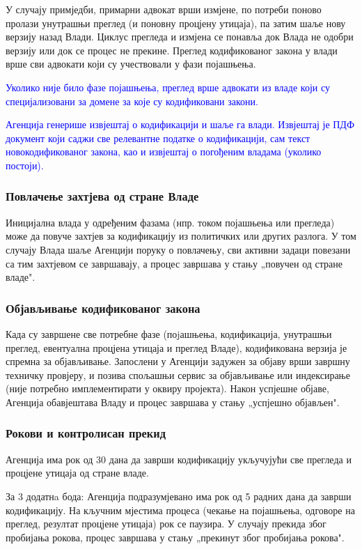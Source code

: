 \documentclass[12pt,a4paper]{article}
\newcommand{\optional}[1]{\textcolor{blue}{#1}}
\newcommand{\bonus}[1]{\textcolor{emerald}{#1}}
\begin{document}
У случају примједби, примарни адвокат врши измјене, по потреби поново пролази унутрашњи преглед (и поновну процјену утицаја), па затим шаље нову верзију назад Влади. Циклус прегледа и измјена се понавља док Влада не одобри верзију или док се процес не прекине. Преглед кодификованог закона у влади врше сви адвокати који су учествовали у фази појашњења.

\optional{Уколико није било фазе појашњења, преглед врше адвокати из владе који су специјализовани за домене за које су кодификовани закони.}

\optional{Агенција генерише извјештај о кодификацији и шаље га влади. Извјештај је ПДФ документ који саджи све релевантне податке о кодификацији, сам текст новокодификованог закона, као и извјештај о погођеним владама (уколико постоји).}

\subsubsection{Повлачење захтјева од стране Владе}

Иницијална влада у одређеним фазама (нпр. током појашњења или прегледа) може да повуче захтјев за кодификацију из политичких или других разлога. У том случају Влада шаље Агенцији поруку о повлачењу, сви активни задаци повезани са тим захтјевом се завршавају, а процес завршава у стању „повучен од стране владе".

\subsubsection{Објављивање кодификованог закона}

Када су завршене све потребне фазе (поjашњења, кодификација, унутрашњи преглед, евентуална процјена утицаја и преглед Владе), кодификована верзија је спремна за објављивање. Запослени у Агенцији задужен за објаву врши завршну техничку провјеру, и позива спољашњи сервис за објављивање или индексирање (није потребно имплементирати у оквиру пројекта). Након успјешне објаве, Агенција обавјештава Владу и процес завршава у стању „успјешно објављен".

\subsubsection{Рокови и контролисан прекид}

Агенција има рок од 30 дана да заврши кодификацију укључујући све прегледа и процјене утицаја од стране владе.

\bonus{За 3 додатнa бода: Агенција подразумјевано има рок од 5 радних дана да заврши кодификацију. На кључним мјестима процеса (чекање на појашњења, одговоре на преглед, резултат процјене утицаја) рок се паузира. У случају прекида због пробијања рокова, процес завршава у стању „прекинут због пробијања рокова".}
\end{document}
